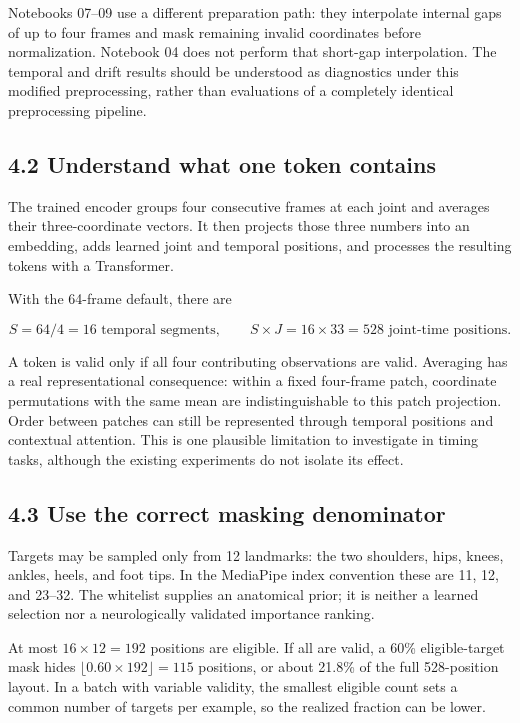 \documentclass[11pt,letterpaper]{article}
\begin{document}
Notebooks 07--09 use a different preparation path: they interpolate
internal gaps of up to four frames and mask remaining invalid
coordinates before normalization. Notebook 04 does not perform that
short-gap interpolation. The temporal and drift results should be
understood as diagnostics under this modified preprocessing, rather than
evaluations of a completely identical preprocessing pipeline.

\subsection{4.2 Understand what one token
contains}\label{understand-what-one-token-contains}

The trained encoder groups four consecutive frames at each joint and
averages their three-coordinate vectors. It then projects those three
numbers into an embedding, adds learned joint and temporal positions,
and processes the resulting tokens with a Transformer.

With the 64-frame default, there are

\[
S=64/4=16 \text{ temporal segments}, \qquad
S\times J=16\times33=528 \text{ joint-time positions}.
\]

A token is valid only if all four contributing observations are valid.
Averaging has a real representational consequence: within a fixed
four-frame patch, coordinate permutations with the same mean are
indistinguishable to this patch projection. Order between patches can
still be represented through temporal positions and contextual
attention. This is one plausible limitation to investigate in timing
tasks, although the existing experiments do not isolate its effect.

\subsection{4.3 Use the correct masking
denominator}\label{use-the-correct-masking-denominator}

Targets may be sampled only from 12 landmarks: the two shoulders, hips,
knees, ankles, heels, and foot tips. In the MediaPipe index convention
these are 11, 12, and 23--32. The whitelist supplies an anatomical
prior; it is neither a learned selection nor a neurologically validated
importance ranking.

At most \(16\times12=192\) positions are eligible. If all are valid, a
60\% eligible-target mask hides \(\lfloor0.60\times192\rfloor=115\)
positions, or about 21.8\% of the full 528-position layout. In a batch
with variable validity, the smallest eligible count sets a common number
of targets per example, so the realized fraction can be lower.
\end{document}
